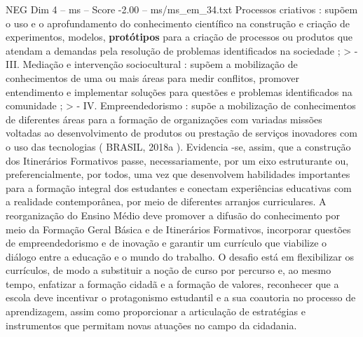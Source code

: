 \begin{textsample}{NEG Dim 4 – ms – Score -2.00 – ms/ms\_em\_34.txt}
Processos criativos : supõem o uso e o aprofundamento do conhecimento científico na construção e criação de experimentos, modelos, \textbf{protótipos} para a criação de processos ou produtos que atendam a demandas pela resolução de problemas identificados na sociedade ; > - III.
Mediação e intervenção sociocultural : supõem a mobilização de conhecimentos de uma ou mais áreas para medir conflitos, promover entendimento e implementar soluções para questões e problemas identificados na comunidade ; > - IV.
Empreendedorismo : supõe a mobilização de conhecimentos de diferentes áreas para a formação de organizações com variadas missões voltadas ao desenvolvimento de produtos ou prestação de serviços inovadores com o uso das tecnologias ( BRASIL, 2018a ).
Evidencia -se, assim, que a construção dos Itinerários Formativos passe, necessariamente, por um eixo estruturante ou, preferencialmente, por todos, uma vez que desenvolvem habilidades importantes para a formação integral dos estudantes e conectam experiências educativas com a realidade contemporânea, por meio de diferentes arranjos curriculares.
A reorganização do Ensino Médio deve promover a difusão do conhecimento por meio da Formação Geral Básica e de Itinerários Formativos, incorporar questões de empreendedorismo e de inovação e garantir um currículo que viabilize o diálogo entre a educação e o mundo do trabalho.
O desafio está em flexibilizar os currículos, de modo a substituir a noção de curso por percurso e, ao mesmo tempo, enfatizar a formação cidadã e a formação de valores, reconhecer que a escola deve incentivar o protagonismo estudantil e a sua coautoria no processo de aprendizagem, assim como proporcionar a articulação de estratégias e instrumentos que permitam novas atuações no campo da cidadania.

\end{textsample}
